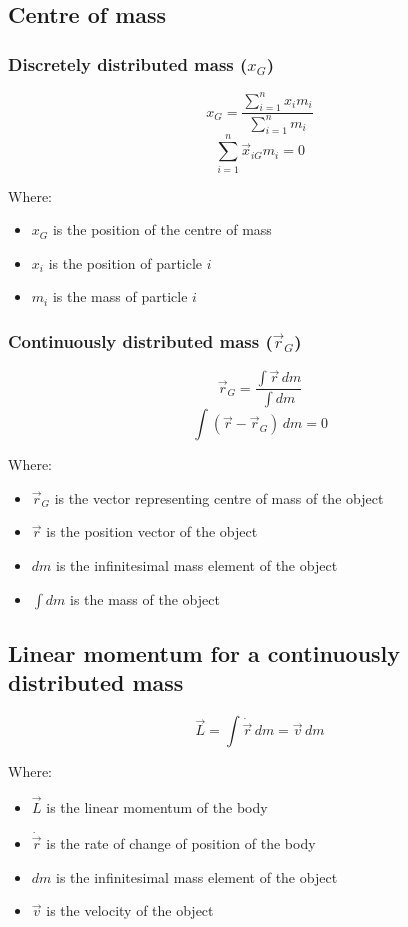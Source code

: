 \documentclass[11pt]{article}
\begin{document}
\subsection{Centre of mass}
\label{sec:org2ac419c}

\subsubsection{Discretely distributed mass (\(x_G\))}
\label{sec:org0002fef}
\[x_G = \frac{\sum_{i = 1}^n x_i m_i}{\sum_{i = 1}^n m_i}\]
\[\sum_{i = 1}^n \vec{x}_{iG} m_i = 0\]

Where:
\begin{itemize}
\item \(x_G\) is the position of the centre of mass
\item \(x_i\) is the position of particle \(i\)
\item \(m_i\) is the mass of particle \(i\)
\end{itemize}

\subsubsection{Continuously distributed mass (\(\vec{r}_G\))}
\label{sec:orgbcea515}
\[\vec{r}_G = \frac{\int \vec{r} \, dm}{\int dm}\]
\[\int (\vec{r} - \vec{r}_G) \, dm = 0\]

Where:
\begin{itemize}
\item \(\vec{r}_G\) is the vector representing centre of mass of the object
\item \(\vec{r}\) is the position vector of the object
\item \(dm\) is the infinitesimal mass element of the object
\item \(\int dm\) is the mass of the object
\end{itemize}

\subsection{Linear momentum for a continuously distributed mass}
\label{sec:orgc7ee344}
\[\vec{L} = \int \dot{\vec{r}} \, dm = \vec{v} \, dm\]

Where:
\begin{itemize}
\item \(\vec{L}\) is the linear momentum of the body
\item \(\dot{\vec{r}}\) is the rate of change of position of the body
\item \(dm\) is the infinitesimal mass element of the object
\item \(\vec{v}\) is the velocity of the object
\end{itemize}
\end{document}
